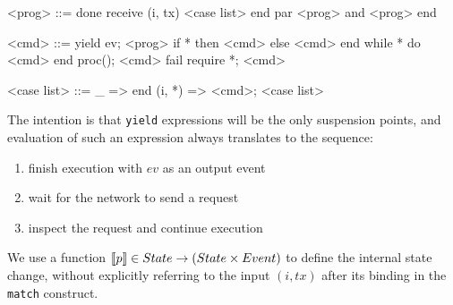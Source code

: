 \documentclass[acmsmall,review,anonymous]{acmart}\settopmatter{printfolios=true}
\begin{document}
\begin{grammar}
    <prog> ::= done
         \alt receive (i, tx) <case list> end   %
         \alt par <prog> and <prog> end
    
	<cmd> ::= yield ev; <prog>                 %
         \alt if * then <cmd> else <cmd> end   %
         \alt while * do <cmd> end             %
         \alt proc(); <cmd>
         \alt fail
         \alt require *; <cmd>

    <case list> ::= \_ => end
        \alt (i, *) => <cmd>; <case list>
\end{grammar}

The intention is that \texttt{yield} expressions will be the only suspension points, and evaluation of such an expression always translates to the sequence:
\begin{enumerate}
\item finish execution with $ev$ as an output event
\item wait for the network to send a request 
\item inspect the request and continue execution
\end{enumerate}

We use a function $\semfunc[p] \in State \rightarrow (State \times Event)$ to define the internal state change, without explicitly referring to the input $(i, tx)$ after its binding in the \texttt{match} construct.
\end{document}
